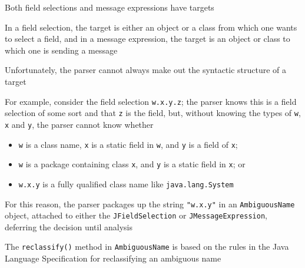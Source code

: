 \documentclass[8pt,a4paper,compress]{beamer}
\begin{document}
\begin{frame}[fragile]
\pause

Both field selections and message expressions have targets

\pause
\bigskip

In a field selection, the target is either an object or a class from which one wants to select a field, and in a message expression, the target is an object or class to which one is sending a message

\pause
\bigskip

Unfortunately, the parser cannot always make out the syntactic structure of a target

\pause
\bigskip

For example, consider the field selection \lstinline{w.x.y.z}; the parser knows this is a field selection of some sort and that \lstinline{z} is the field, but, without knowing the types of \lstinline{w}, \lstinline{x} and \lstinline{y}, the parser cannot know whether
\begin{itemize}
\pause
\item \lstinline{w} is a class name,  \lstinline{x} is a static field in \lstinline{w}, and \lstinline{y} is a field of \lstinline{x};
\pause
\item \lstinline{w} is a package containing class \lstinline{x}, and \lstinline{y} is a static field in \lstinline{x}; or
\pause
\item \lstinline{w.x.y} is a fully qualified class name like \lstinline{java.lang.System}
\end{itemize}

\pause
\bigskip

For this reason, the parser packages up the string \lstinline{"w.x.y"} in an \lstinline{AmbiguousName} object, attached to either the \lstinline{JFieldSelection} or \lstinline{JMessageExpression}, deferring the decision until analysis

\pause
\bigskip

The \lstinline{reclassify()} method in \lstinline{AmbiguousName} is based on the rules in the Java Language Specification for reclassifying an ambiguous name
\end{frame}
\end{document}
